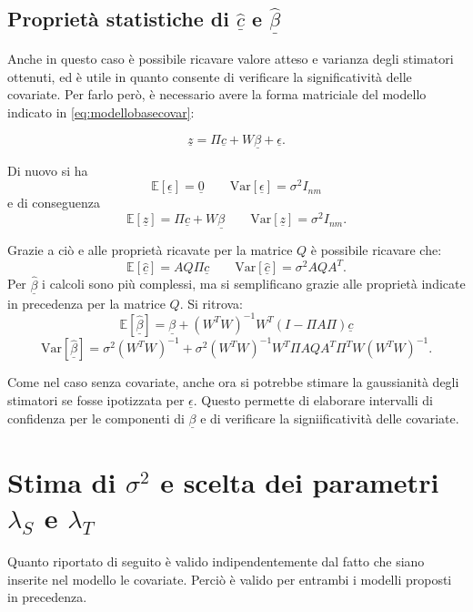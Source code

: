 \documentclass[a4paper,11pt,twoside,openright]{book}							%
\begin{document}
\subsection*{Proprietà statistiche di $\hat  {\underline c}$ e $\hat  {\underline \beta}$}
Anche in questo caso è possibile ricavare valore atteso e varianza degli stimatori ottenuti, ed è utile in quanto consente di verificare la significatività delle covariate. Per farlo però, è necessario avere la forma matriciale del modello indicato in \ref{eq:modellobasecovar}:

\begin{equation}
\label{eq:modellobasecovarmatric}
\underline z=\Pi \underline c + W \underline \beta + \underline \epsilon .
\end{equation}

Di nuovo si ha 
$$
\mathbb{E}[\underline \epsilon] = \underline 0 \qquad \mathrm{Var}[\underline \epsilon] = \sigma^2 I_{nm}
$$
e di conseguenza
$$
\mathbb{E}[\underline z] = \Pi \underline c + W \underline \beta \qquad \mathrm{Var}[\underline z] = \sigma^2 I_{nm} .
$$

Grazie a ciò e alle proprietà ricavate per la matrice $Q$ è possibile ricavare che:
$$
\mathbb{E}[\hat  {\underline c}] = AQ\Pi \underline c \qquad \mathrm{Var}[\hat  {\underline c}] = \sigma^2 AQA^T .
$$
Per $\hat  {\underline \beta}$ i calcoli sono più complessi, ma si semplificano grazie alle proprietà indicate in precedenza per la matrice $Q$. Si ritrova:
$$
\mathbb{E}[\hat  {\underline \beta}] = \underline \beta + (W^TW)^{-1}W^T(I-\Pi A\Pi)\underline c
$$
$$ \mathrm{Var}[\hat  {\underline \beta}] = \sigma^2 (W^TW)^{-1} + \sigma^2 (W^TW)^{-1}W^T \Pi A Q A^T \Pi^T W(W^TW)^{-1}.
$$

Come nel caso senza covariate, anche ora si potrebbe stimare la gaussianità degli stimatori se fosse ipotizzata per $\underline \epsilon$. Questo permette di elaborare intervalli di confidenza per le componenti di $\underline \beta$ e di verificare la signiificatività delle covariate.


\section{Stima di $\sigma^2$ e scelta dei parametri $\lambda_S$ e $\lambda_T$}
\label{sez:GCV}

Quanto riportato di seguito è valido indipendentemente dal fatto che siano inserite nel modello le covariate. Perciò è valido per entrambi i modelli proposti in precedenza.
\end{document}
